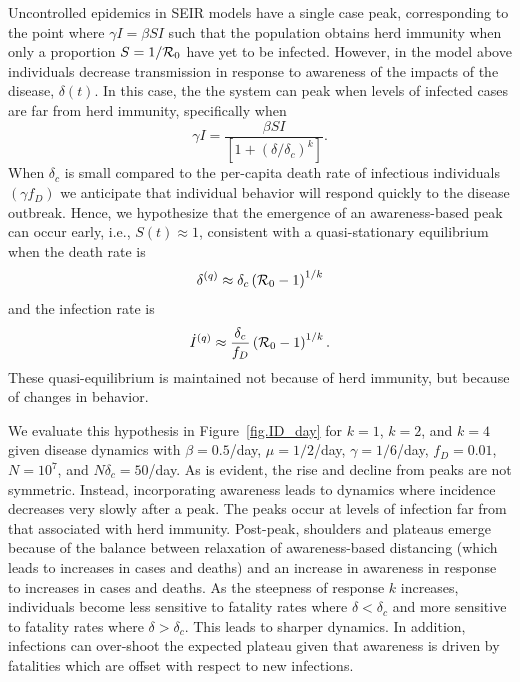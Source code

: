 Uncontrolled epidemics in SEIR models have a single case peak, corresponding 
to the point where $\gamma I = \beta S I $ such that 
the population obtains herd immunity when only a proportion
$S=1/{\cal{R}}_0$ have yet to be infected.
However, in the model above individuals decrease transmission in response
to awareness of the impacts of the disease, $\delta(t)$.
In this case, the the system can peak when levels of infected cases are
far from herd immunity, specifically when
\begin{equation}
\gamma I = \frac{\beta SI}{\left[1+\left(\delta/\delta_c\right)^{k}\right]}.
\end{equation}
When $\delta_c$ is small compared to the per-capita death rate of infectious individuals $(\gamma f_D)$ we anticipate that individual behavior will respond quickly to the disease outbreak.
Hence, we hypothesize that the
emergence of an
awareness-based peak can occur early, i.e., $S(t)\approx 1$, consistent
with a quasi-stationary equilibrium when the death rate is
\begin{equation}
\delta^{(q)} \approx \delta_c\left({\cal{R}}_0-1\right)^{1/k}
\end{equation}
and the infection rate is
\begin{equation}
\dot{I}^{(q)} \approx \frac{\delta_c}{f_D}\left({\cal{R}}_0-1\right)^{1/k}.
\end{equation}
These quasi-equilibrium is maintained not because of herd immunity, but because of changes in behavior. 

We evaluate this hypothesis in
Figure~\ref{fig.ID_day} for $k=1$, $k=2$, and $k=4$
given disease dynamics with $\beta=0.5$/day, $\mu=1/2$/day, $\gamma=1/6$/day,
$f_D=0.01$, $N=10^7$, and $N\delta_c=50$/day.  
As is evident, the rise and decline from peaks are not symmetric. Instead,
incorporating
awareness leads to dynamics where incidence decreases very slowly after a peak.
The peaks occur at levels of infection far from that associated
with herd immunity.  
Post-peak, shoulders and plateaus emerge because of the balance
between relaxation of awareness-based
distancing (which leads to increases in cases and deaths) and an 
increase in awareness in response to increases in cases and deaths.  
As the steepness of response $k$ increases, 
individuals become less sensitive to fatality rates
where $\delta < \delta_c$ and more sensitive to fatality rates where $\delta > \delta_c$.  
This leads to sharper dynamics. In addition, 
infections can over-shoot the expected plateau given that awareness
is driven by fatalities which are offset with respect to new infections.

